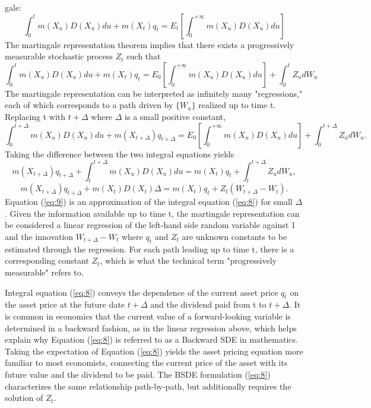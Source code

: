 \documentclass{article}
\begin{document}
gale:
\[
\int_{0}^{t}m(X_{u})D(X_{u})du+m(X_{t})q_{t}=E_{t}\left[\int_{0}^{+\infty}m(X_{u})D(X_{u})du\right]
\]
The martingale representation theorem implies that there exists a progressively measurable stochastic process $Z_{t}$ such that
\begin{equation}
\int_{0}^{t}m(X_{u})D(X_{u})du+m(X_{t})q_{t}=E_{0}\left[\int_{0}^{+\infty}m(X_{u})D(X_{u})du\right]+\int_{0}^{t}Z_{u}dW_{u}
\label{eq:7}
\end{equation}
The martingale representation can be interpreted as infinitely many "regressions," each of which corresponds to a path driven by $\{W_{u}\}$ realized up to time t. Replacing t with $t+\Delta$ where $\Delta$ is a small positive constant,
\[
\int_{0}^{t+\Delta}m(X_{u})D(X_{u})du+m(X_{t+\Delta})q_{t+\Delta}=E_{0}\left[\int_{0}^{+\infty}m(X_{u})D(X_{u})du\right]+\int_{0}^{t+\Delta}Z_{u}dW_{u}.
\]
Taking the difference between the two integral equations yields
\begin{equation}
m(X_{t+\Delta})q_{t+\Delta}+\int_{t}^{t+\Delta}m(X_{u})D(X_{u})du=m(X_{t})q_{t}+\int_{t}^{t+\Delta}Z_{u}dW_{u},
\label{eq:8}
\end{equation}
\begin{equation}
m(X_{t+\Delta})q_{t+\Delta}+m(X_{t})D(X_{t})\Delta=m(X_{t})q_{t}+Z_{t}(W_{t+\Delta}-W_{t}).
\label{eq:9}
\end{equation}
Equation (\ref{eq:9}) is an approximation of the integral equation (\ref{eq:8}) for small $\Delta$. Given the information available up to time t, the martingale representation can be considered a linear regression of the left-hand side random variable against 1 and the innovation $W_{t+\Delta}-W_{t}$ where $q_{t}$ and $Z_{t}$ are unknown constants to be estimated through the regression. For each path leading up to time t, there is a corresponding constant $Z_{t}$, which is what the technical term "progressively measurable" refers to.

Integral equation (\ref{eq:8}) conveys the dependence of the current asset price $q_{t}$ on the asset price at the future date $t+\Delta$ and the dividend paid from t to $t+\Delta$. It is common in economics that the current value of a forward-looking variable is determined in a backward fashion, as in the linear regression above, which helps explain why Equation (\ref{eq:8}) is referred to as a Backward SDE in mathematics. Taking the expectation of Equation (\ref{eq:8}) yields the asset pricing equation more familiar to most economists, connecting the current price of the asset with its future value and the dividend to be paid. The BSDE formulation (\ref{eq:8}) characterizes the same relationship path-by-path, but additionally requires the solution of $Z_{t}$.
\end{document}
